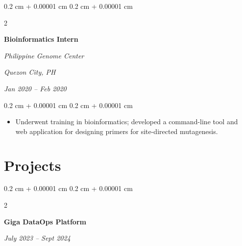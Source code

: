 \documentclass[10pt, a4paper]{article}
\newenvironment{highlights}{
    \begin{itemize}[
        topsep=0.10 cm,
        parsep=0.10 cm,
        partopsep=0pt,
        itemsep=0pt,
        leftmargin=0.4 cm + 10pt
    ]
}{
    \end{itemize}
} %
\newenvironment{onecolentry}{
    \begin{adjustwidth}{
        0.2 cm + 0.00001 cm
    }{
        0.2 cm + 0.00001 cm
    }
}{
    \end{adjustwidth}
} %
\newenvironment{twocolentry}[2][]{
    \onecolentry
    \def\secondColumn{#2}
    \setcolumnwidth{\fill, 4.5 cm}
    \begin{paracol}{2}
}{
    \switchcolumn \raggedleft \secondColumn
    \end{paracol}
    \endonecolentry
} %
\begin{document}
        \vspace{0.2 cm}

        \begin{twocolentry}{
        \textit{Quezon City, PH}    
            
        \textit{Jan 2020 – Feb 2020}}
            \textbf{Bioinformatics Intern}
            
            \textit{Philippine Genome Center}
        \end{twocolentry}

        \vspace{0.10 cm}
        \begin{onecolentry}
            \begin{highlights}
                \item Underwent training in bioinformatics; developed a command-line tool and web application for designing  primers for site-directed mutagenesis.

            \end{highlights}
        \end{onecolentry}



    
    \section{Projects}



        
        \begin{twocolentry}{
            
            
        \textit{July 2023 – Sept 2024}}
            \textbf{Giga DataOps Platform}
        \end{twocolentry}
\end{document}
